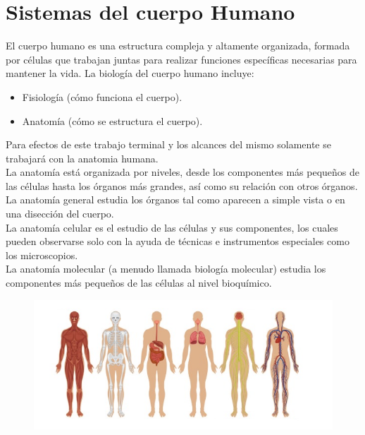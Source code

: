 \section{Sistemas del cuerpo Humano}
El cuerpo humano es una estructura compleja y altamente organizada, formada por células que trabajan juntas para realizar funciones específicas necesarias 
para mantener la vida.\cite{web17} La biología del cuerpo humano incluye:
\begin{itemize}
	\item Fisiología (cómo funciona el cuerpo).
	\item Anatomía (cómo se estructura el cuerpo).	
\end{itemize}
Para efectos de este trabajo terminal y los alcances del mismo solamente se trabajará con la anatomia humana.\\
La anatomía está organizada por niveles, desde los componentes más pequeños de las células hasta los órganos más grandes, así como su relación con otros órganos.\\
La anatomía general estudia los órganos tal como aparecen a simple vista o en una disección del cuerpo.\\
La anatomía celular es el estudio de las células y sus componentes, los cuales pueden observarse solo con la ayuda de técnicas e instrumentos especiales como los microscopios.\\
La anatomía molecular (a menudo llamada biología molecular) estudia los componentes más pequeños de las células al nivel bioquímico.\\
\begin{figure}[H]
\begin{center}
	\includegraphics[width = .7\textwidth]{source/images/image22.png}
	\end{center} 
\end{figure}

